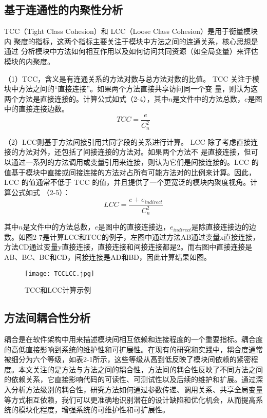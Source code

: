 \subsection{基于连通性的内聚性分析}
TCC（Tight Class Cohesion）和 LCC（Loose Class Cohesion）是用于衡量模块内
聚度的指标，这两个指标主要关注于模块中方法之间的连通关系，核心思想是通过
分析模块中方法如何相互作用以及如何访问共同资源（如全局变量）来评估模块的内聚度。


（1）TCC，含义是有连通关系的方法对数与总方法对数的比值\cite{1995Cohesion}。
TCC 关注于模块中方法之间的“直接连接”。如果两个方法直接共享访问同一个变
量，则认为这两个方法是直接连接的。计算公式如式（2-4），其中\(n\)是文件中的方法总数，\(e\)是图中的直接连接边数。
\begin{equation}
{TCC} = \frac{e}{C_{n}^{2}}
\end{equation}

（2）LCC则基于方法间接引用共同字段的关系进行计算\cite{1995Cohesion}。
LCC 除了考虑直接连接的方法对外，还包括了间接连接的方法对。如果两个方法不
是直接连接，但可以通过一系列的方法调用或变量引用来连接，则认为它们是间接连接的。LCC 的值基于模块中直接或间接连接的方法对占所有可能方法对的比例来计算。因此，LCC 的值通常不低于 TCC 的值，并且提供了一个更宽泛的模块内聚度视角。计算公式如式 （2-5）：
\begin{equation}
{LCC=\frac{e+e_{indirect}}{C_{n}^{2}}}
\end{equation}

其中\(n\)是文件中的方法总数，\(e\)是图中的直接连接边，\(e_{indirect}\)是除直接连接边的边数。如图2-7是计算LCC和TCC的例子，左图中通过方法AB通过变量x直接连接，方法CD通过变量y直接连接，直接连接和间接连接都是2。而右图中直接连接是AB、BC、BC和CD，间接连接是AD和BD，因此计算结果如图。

\begin{figure}[h]
\centering
\texttt{[image: TCCLCC.jpg]}
\caption{TCC和LCC计算示例}
\end{figure}


\subsection{方法间耦合性分析}

耦合是在软件架构中用来描述模块间相互依赖和连接程度的一个重要指标。耦合度的高低直接影响到系统的维护性和可扩展性。在现有的研究和实践中，耦合度通常被细分为六个等级，如表2-1所示，这些等级从高到低反映了模块间依赖的紧密程度。本文关注的是方法与方法之间的耦合性，方法间的耦合性反映了不同方法之间的依赖关系，它直接影响代码的可读性、可测试性以及后续的维护和扩展。通过深入分析方法级别的耦合性，研究方法如何通过参数传递、调用关系、共享全局变量等方式相互依赖，我们可以更准确地识别潜在的设计缺陷和优化机会，从而提高系统的模块化程度，增强系统的可维护性和可扩展性。

